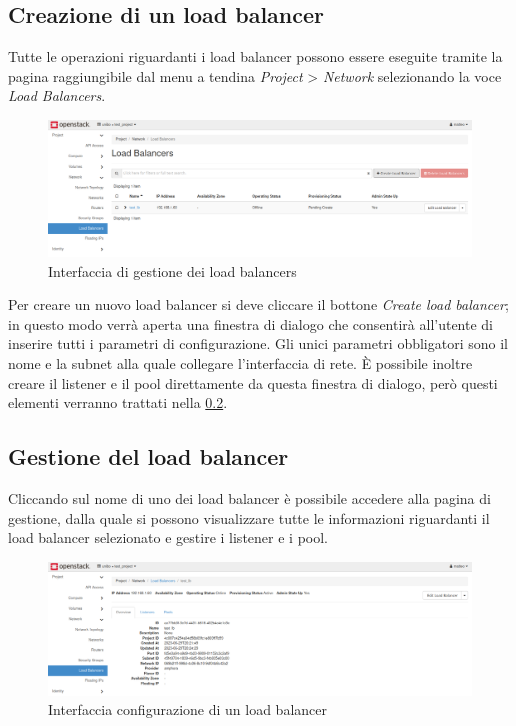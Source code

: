 \subsection{Creazione di un load balancer}

Tutte le operazioni riguardanti i load balancer possono essere eseguite tramite la pagina raggiungibile dal menu a tendina \emph{Project} > \emph{Network} selezionando la voce \emph{Load Balancers}.

\begin{figure}[H]
    \center
    \includegraphics[scale=0.35]{tesi/files/immagini/load_balancer_usage/load_balancers_interface.png}
    \caption{Interfaccia di gestione dei load balancers}
    \label{fig:lb_mgmt_interface}
\end{figure}

Per creare un nuovo load balancer si deve cliccare il bottone \emph{Create load balancer}; in questo modo verrà aperta una finestra di dialogo che consentirà all'utente di inserire tutti i parametri di configurazione. Gli unici parametri obbligatori sono il nome e la subnet alla quale collegare l'interfaccia di rete. È possibile inoltre creare il listener e il pool direttamente da questa finestra di dialogo, però questi elementi verranno trattati nella \cref{subsec:load_balancer_management}.

\subsection{Gestione del load balancer}\label{subsec:load_balancer_management}

Cliccando sul nome di uno dei load balancer è possibile accedere alla pagina di gestione, dalla quale si possono visualizzare tutte le informazioni riguardanti il load balancer selezionato e gestire i listener e i pool.

\begin{figure}[H]
    \center
    \includegraphics[scale=0.35]{tesi/files/immagini/load_balancer_usage/load_balancer_settings.png}
    \caption{Interfaccia configurazione di un load balancer}
    \label{fig:lb_settings}
\end{figure}

